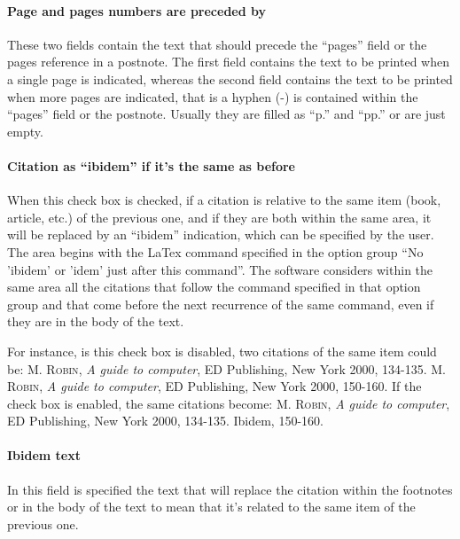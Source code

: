 \documentclass[a4paper,12pt]{report}
\begin{document}
\paragraph{Page and pages numbers are preceded by} These two fields contain the text that should precede the “pages” field or the pages reference in a postnote. The first field contains the text to be printed when a single page is indicated, whereas the second field contains the text to be printed when more pages are indicated, that is a hyphen (-) is contained within the “pages” field or the postnote. Usually they are filled as “p.” and “pp.” or are just empty.

\paragraph{Citation as “ibidem” if it's the same as before} When this check box is checked, if a citation is relative to the same item (book, article, etc.) of the previous one, and if they are both within the same area, it will be replaced by an “ibidem” indication, which can be specified by the user. The area begins with the LaTex command specified in the option group “No 'ibidem' or 'idem' just after this command”. The software considers within the same area all the citations that follow the command specified in that option group and that come before the next recurrence of the same command, even if they are in the body of the text.

\noindent For instance, is this check box is disabled, two citations of the same item could be: \textsc{M. Robin}, \textit{A guide to computer}, ED Publishing, New York 2000, 134-135. \textsc{M. Robin}, \textit{A guide to computer}, ED Publishing, New York 2000, 150-160. If the check box is enabled, the same citations become: \textsc{M. Robin}, \textit{A guide to computer}, ED Publishing, New York 2000, 134-135. Ibidem, 150-160.

\paragraph{Ibidem text} In this field is specified the text that will replace the citation within the footnotes or in the body of the text to mean that it's related to the same item of the previous one.
\end{document}
